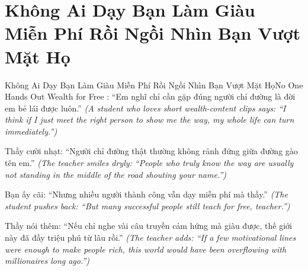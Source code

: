 \section{Không Ai Dạy Bạn Làm Giàu Miễn Phí Rồi Ngồi Nhìn Bạn Vượt Mặt Họ}
\begin{truyen}{Không Ai Dạy Bạn Làm Giàu Miễn Phí Rồi Ngồi Nhìn Bạn Vượt Mặt Họ}{No One Hands Out Wealth for Free}
: ``Em nghĩ chỉ cần gặp đúng người chỉ đường là đời em bẻ lái được luôn.''
\textit{(A student who loves short wealth-content clips says: ``I think if I just meet the right person to show me the way, my whole life can turn immediately.'')}

Thầy cười nhạt: ``Người chỉ đường thật thường không rảnh đứng giữa đường gào tên em.''
\textit{(The teacher smiles dryly: ``People who truly know the way are usually not standing in the middle of the road shouting your name.'')}

Bạn ấy cãi: ``Nhưng nhiều người thành công vẫn dạy miễn phí mà thầy.''
\textit{(The student pushes back: ``But many successful people still teach for free, teacher.'')}


Thầy nói thêm: ``Nếu chỉ nghe vài câu truyền cảm hứng mà giàu được, thế giới này đã đầy triệu phú từ lâu rồi.''
\textit{(The teacher adds: ``If a few motivational lines were enough to make people rich, this world would have been overflowing with millionaires long ago.'')}
\end{truyen}

